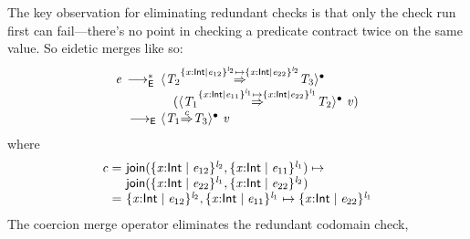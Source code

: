 \documentclass[9pt]{extarticle}
\newcommand{\ottnt}[1]{\mathit{#1}}
\begin{document}
The key observation for eliminating redundant checks is that only the check run first
can fail---there's no point in checking a predicate contract twice on
the same value. So eidetic \lambdah merges like so:
\[ \begin{array}{r@{~}l}
  \ottnt{e} \,  \longrightarrow ^{*}_{  \mathsf{E}  }  \,    &  \langle  \ottnt{T_{{\mathrm{2}}}}  \mathord{ \overset{  \{ \mathit{x} \mathord{:}  \mathsf{Int}  \mathrel{\mid} \ottnt{e_{{\mathrm{12}}}} \}^{ \ottnt{l_{{\mathrm{2}}}} }   \mapsto   \{ \mathit{x} \mathord{:}  \mathsf{Int}  \mathrel{\mid} \ottnt{e_{{\mathrm{22}}}} \}^{ \ottnt{l_{{\mathrm{2}}}} }  }{\Rightarrow} }  \ottnt{T_{{\mathrm{3}}}}  \rangle^{\bullet} ~  {} \\  &  \quad   (  \langle  \ottnt{T_{{\mathrm{1}}}}  \mathord{ \overset{  \{ \mathit{x} \mathord{:}  \mathsf{Int}  \mathrel{\mid} \ottnt{e_{{\mathrm{11}}}} \}^{ \ottnt{l_{{\mathrm{1}}}} }   \mapsto   \{ \mathit{x} \mathord{:}  \mathsf{Int}  \mathrel{\mid} \ottnt{e_{{\mathrm{22}}}} \}^{ \ottnt{l_{{\mathrm{1}}}} }  }{\Rightarrow} }  \ottnt{T_{{\mathrm{2}}}}  \rangle^{\bullet} ~  \mathit{v}  )   \\
   \longrightarrow _{  \mathsf{E}  }  &  \langle  \ottnt{T_{{\mathrm{1}}}}  \mathord{ \overset{ \ottnt{c} }{\Rightarrow} }  \ottnt{T_{{\mathrm{3}}}}  \rangle^{\bullet} ~  \mathit{v}  \\
\end{array} \]
where
\[ \begin{array}{r@{~}l}
  \ottnt{c} = &  \mathsf{join} (  \{ \mathit{x} \mathord{:}  \mathsf{Int}  \mathrel{\mid} \ottnt{e_{{\mathrm{12}}}} \}^{ \ottnt{l_{{\mathrm{2}}}} }  ,  \{ \mathit{x} \mathord{:}  \mathsf{Int}  \mathrel{\mid} \ottnt{e_{{\mathrm{11}}}} \}^{ \ottnt{l_{{\mathrm{1}}}} }  )   \mapsto  {} \\  &   \mathsf{join} (  \{ \mathit{x} \mathord{:}  \mathsf{Int}  \mathrel{\mid} \ottnt{e_{{\mathrm{22}}}} \}^{ \ottnt{l_{{\mathrm{1}}}} }  ,  \{ \mathit{x} \mathord{:}  \mathsf{Int}  \mathrel{\mid} \ottnt{e_{{\mathrm{22}}}} \}^{ \ottnt{l_{{\mathrm{2}}}} }  )  \\
  = &   \{ \mathit{x} \mathord{:}  \mathsf{Int}  \mathrel{\mid} \ottnt{e_{{\mathrm{12}}}} \}^{ \ottnt{l_{{\mathrm{2}}}} }  ,  \{ \mathit{x} \mathord{:}  \mathsf{Int}  \mathrel{\mid} \ottnt{e_{{\mathrm{11}}}} \}^{ \ottnt{l_{{\mathrm{1}}}} }    \mapsto   \{ \mathit{x} \mathord{:}  \mathsf{Int}  \mathrel{\mid} \ottnt{e_{{\mathrm{22}}}} \}^{ \ottnt{l_{{\mathrm{1}}}} } 
\end{array} \]
The coercion merge operator eliminates the redundant codomain check,
\end{document}
